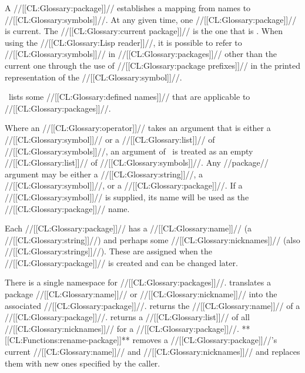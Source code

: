







A //[[CL:Glossary:package]]// establishes a mapping from names to //[[CL:Glossary:symbols]]//. 
At any given time, one //[[CL:Glossary:package]]// is current.
The //[[CL:Glossary:current package]]// is the one that is .
When using the //[[CL:Glossary:Lisp reader]]//,
it is possible to refer to //[[CL:Glossary:symbols]]// in //[[CL:Glossary:packages]]// 
other than the current one through the use of //[[CL:Glossary:package prefixes]]// in the 
printed representation of the //[[CL:Glossary:symbol]]//.


\Thenextfigure\ lists some //[[CL:Glossary:defined names]]// that are applicable
to //[[CL:Glossary:packages]]//.



Where an //[[CL:Glossary:operator]]// 
takes an argument that is either a //[[CL:Glossary:symbol]]// or a //[[CL:Glossary:list]]// 
of //[[CL:Glossary:symbols]]//,
an argument of \nil\ is treated as an empty //[[CL:Glossary:list]]// of //[[CL:Glossary:symbols]]//.
Any //package// argument may be either a //[[CL:Glossary:string]]//, a //[[CL:Glossary:symbol]]//, or
a //[[CL:Glossary:package]]//.  If a //[[CL:Glossary:symbol]]// is supplied, its name will be used
as the //[[CL:Glossary:package]]// name.








Each //[[CL:Glossary:package]]// has a //[[CL:Glossary:name]]// (a //[[CL:Glossary:string]]//) and perhaps some //[[CL:Glossary:nicknames]]//
(also //[[CL:Glossary:strings]]//).
These are assigned when the //[[CL:Glossary:package]]// is created and can be changed later.  


There is a single namespace for //[[CL:Glossary:packages]]//.  
 translates a package
//[[CL:Glossary:name]]// or //[[CL:Glossary:nickname]]// into the associated //[[CL:Glossary:package]]//.  
 returns the //[[CL:Glossary:name]]// of a //[[CL:Glossary:package]]//.  
 returns 
a //[[CL:Glossary:list]]// of all //[[CL:Glossary:nicknames]]// for a //[[CL:Glossary:package]]//.
**[[CL:Functions:rename-package]]** removes a //[[CL:Glossary:package]]//'s
current //[[CL:Glossary:name]]// and //[[CL:Glossary:nicknames]]// and replaces them with new ones
specified by the caller.

